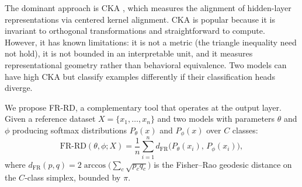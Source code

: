 \documentclass[11pt]{article}
\begin{document}
The dominant approach is CKA \citep{kornblith2019similarity}, which measures the alignment
of hidden-layer representations via centered kernel alignment. CKA is popular because it is
invariant to orthogonal transformations and straightforward to compute. However, it has
known limitations: it is not a metric (the triangle inequality need not hold), it is not
bounded in an interpretable unit, and it measures representational geometry rather than
behavioral equivalence. Two models can have high CKA but classify examples differently if
their classification heads diverge.

We propose FR-RD, a complementary tool that operates at the output layer. Given a reference
dataset $X = \{x_1, \ldots, x_n\}$ and two models with parameters $\theta$ and $\phi$
producing softmax distributions $P_\theta(x)$ and $P_\phi(x)$ over $C$ classes:
\begin{equation}
  \mathrm{FR\text{-}RD}(\theta, \phi; X)
  = \frac{1}{n}\sum_{i=1}^n d_{\mathrm{FR}}\!\big(P_\theta(x_i),\, P_\phi(x_i)\big),
  \label{eq:fr-rd}
\end{equation}
where $d_{\mathrm{FR}}(p,q) = 2\arccos\!\bigl(\sum_c\sqrt{p_c q_c}\bigr)$ is the
Fisher--Rao geodesic distance on the $C$-class simplex, bounded by $\pi$.
\end{document}
